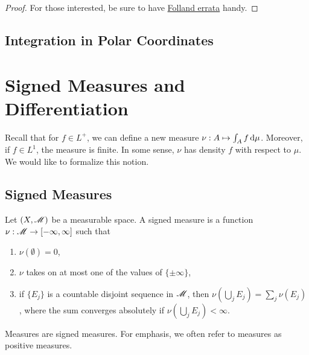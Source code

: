 \documentclass[12pt]{article} %
\begin{document}
\begin{proof}
    For those interested, be sure to have \href{https://sites.math.washington.edu//~folland/Homepage/oldreals.pdf}{Folland errata} handy.
\end{proof}

\subsection{Integration in Polar Coordinates}


\section{Signed Measures and Differentiation}

Recall that for $f \in L^+$, we can define a new measure $\nu : A \mapsto \int_A f \, \mathrm{d} \mu$. Moreover, if $f \in L^1$, the measure is finite. In some sense, $\nu$ has density $f$ with respect to $\mu$. We would like to formalize this notion.

\subsection{Signed Measures}

\begin{definition}
    Let $(X, \mathscr{M})$ be a measurable space. A signed measure is a function $\nu : \mathscr{M} \to [-\infty, \infty]$ such that \begin{enumerate}
        \item $\nu(\emptyset) = 0$,
        \item $\nu$ takes on at most one of the values of $\{\pm \infty\}$,
        \item if $\{E_j\}$ is a countable disjoint sequence in $\mathscr{M}$, then $\nu(\bigcup_j E_j) = \sum_j \nu(E_j)$, where the sum converges absolutely if $\nu(\bigcup_j E_j) < \infty$.
    \end{enumerate}
\end{definition}

\begin{remark}
    Measures are signed measures. For emphasis, we often refer to measures as positive measures.
\end{remark}
\end{document}
